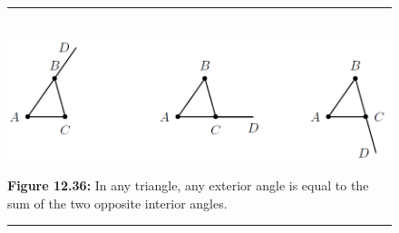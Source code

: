 	\begin{figure}[H] %
    \begin{center}
    \rule[.1in]{\figurerulewidth}{.005in} \\
        \label{m39368*uid46!!!underscore!!!media}\label{m39368*uid46!!!underscore!!!printimage}\includegraphics{col11306.imgs/m39368_MG10C13_030.png} %
      \vspace{2pt}
    \vspace{\rubberspace}\par \begin{cnxcaption}
	  \small \textbf{Figure 12.36: }In any triangle, any exterior angle is equal to the sum of the two opposite interior angles.
	\end{cnxcaption}
    \vspace{.1in}
    \rule[.1in]{\figurerulewidth}{.005in} \\
    \end{center}
 \end{figure}       
        \label{m39368*uid47}
